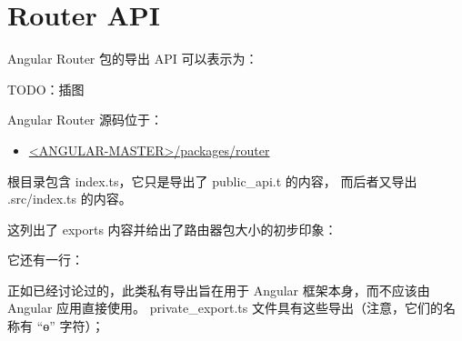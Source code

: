 \section{Router API}


Angular Router 包的导出 API 可以表示为：

TODO：插图


Angular Router 源码位于：

\begin{itemize}
  \item \href{https://github.com/angular/angular/tree/master/packages/router}
        {<ANGULAR-MASTER>/packages/router}
\end{itemize}


根目录包含 index.ts，它只是导出了 public\_api.t 的内容，
而后者又导出 .src/index.ts 的内容。


这列出了 exports 内容并给出了路由器包大小的初步印象：




它还有一行：




正如已经讨论过的，此类私有导出旨在用于 Angular 框架本身，而不应该由 Angular 应用直接使用。
private\_export.ts 文件具有这些导出（注意，它们的名称有 “ɵ” 字符）；


